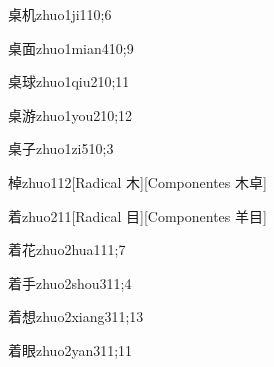 \begin{verbete}{桌机}{zhuo1ji1}{10;6}
\end{verbete}

\begin{verbete}{桌面}{zhuo1mian4}{10;9}
\end{verbete}

\begin{verbete}{桌球}{zhuo1qiu2}{10;11}
\end{verbete}

\begin{verbete}{桌游}{zhuo1you2}{10;12}
\end{verbete}

\begin{verbete}{桌子}{zhuo1zi5}{10;3}
\end{verbete}

\begin{verbete}{棹}{zhuo1}{12}[Radical 木][Componentes 木卓]
\end{verbete}

\begin{verbete}{着}{zhuo2}{11}[Radical 目][Componentes 羊目]
\end{verbete}

\begin{verbete}{着花}{zhuo2hua1}{11;7}
\end{verbete}

\begin{verbete}{着手}{zhuo2shou3}{11;4}
\end{verbete}

\begin{verbete}{着想}{zhuo2xiang3}{11;13}
\end{verbete}

\begin{verbete}{着眼}{zhuo2yan3}{11;11}
\end{verbete}

